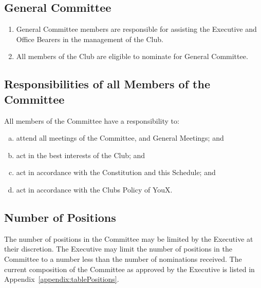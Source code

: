 \documentclass{schedule}
\begin{document}
\subsection{General Committee}
\begin{enumerate}[(1)]
    \item General Committee members are responsible for assisting the Executive and Office Bearers in the management of the Club.
    \item All members of the Club are eligible to nominate for General Committee.
\end{enumerate}

\subsection{Responsibilities of all Members of the Committee}
All members of the Committee have a responsibility to:
\begin{enumerate}[(a)]
    \item attend all meetings of the Committee, and General Meetings; and
    \item act in the best interests of the Club; and
    \item act in accordance with the Constitution and this Schedule; and
    \item act in accordance with the Clubs Policy of YouX.
\end{enumerate}

\subsection{Number of Positions}
The number of positions in the Committee may be limited by the Executive at their discretion. The Executive may limit the number of positions in the Committee to a number less than the number of nominations received. The current composition of the Committee as approved by the Executive is listed in Appendix~\ref{appendix:tablePositions}.

\appendix
\end{document}
